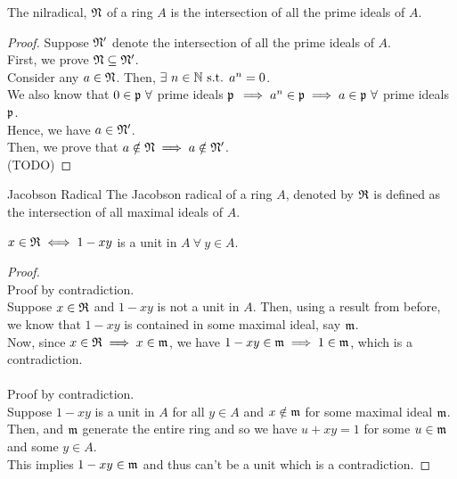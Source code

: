 \begin{proposition}{}{} \label{prop:nilradical_intersection_primes}
	The nilradical, \( \mathfrak{N} \) of a ring \( A \) is the
	intersection of all the prime ideals of \( A \).
\end{proposition}
\begin{proof}
	Suppose \( \mathfrak{N}' \) denote the intersection of all the prime ideals
	of \( A \). \\

	First, we prove \( \mathfrak{N} \subseteq \mathfrak{N}' \). \\
	Consider any \( a \in \mathfrak{N} \).
	Then, \( \exists\ n \in \NN \st a^n = 0 \). \\
	We also know that \( 0 \in \mathfrak{p}\ \forall \) prime ideals \( \mathfrak{p} \)
	\( \implies a^n \in \mfp \implies a \in \mfp\ \forall \)
	prime ideals \( \mathfrak{p} \). \\
	Hence, we have \( a \in \mathfrak{N}' \). \\

	Then, we prove that \( a \notin \mathfrak{N} \implies a \notin \mathfrak{N}' \). \\
	(TODO)

\end{proof}


\begin{defn}{Jacobson Radical}{}
	The Jacobson radical of a ring \( A \), denoted by \( \mathfrak{R} \) is
	defined as the intersection of all maximal ideals of \( A \).
\end{defn}

\begin{proposition}{}{}
	\( x \in \mathfrak{R} \iff 1 - xy \) is a unit in \( A\ \forall\ y \in A \).
\end{proposition}
\begin{proof}
	\brak{\implies} \\
	Proof by contradiction. \\
	Suppose \( x \in \mathfrak{R} \) and \( 1 - xy \) is not a unit in \( A \).
	Then, using a result from before, we know that \( 1 - xy \) is
	contained in some maximal ideal, say \( \mathfrak{m} \). \\
	Now, since \( x \in \mathfrak{R} \implies x \in \mathfrak{m} \), we have
	\( 1 - xy \in \mathfrak{m} \implies 1 \in \mathfrak{m} \), which
	is a contradiction. \\

	\brak{\Longleftarrow} \\
	Proof by contradiction. \\
	Suppose \( 1 - xy \) is a unit in \( A \) for all \( y \in A \)
	and \( x \notin \mathfrak{m} \) for some maximal ideal \( \mathfrak{m} \). \\
	Then,  and \( \mathfrak{m} \) generate the entire ring and so
	we have \( u + xy = 1 \) for some \( u \in \mathfrak{m} \) and some
	\( y \in A \). \\
	This implies \( 1 - xy \in \mathfrak{m} \) and thus can't be a unit
	which is a contradiction.
\end{proof}


